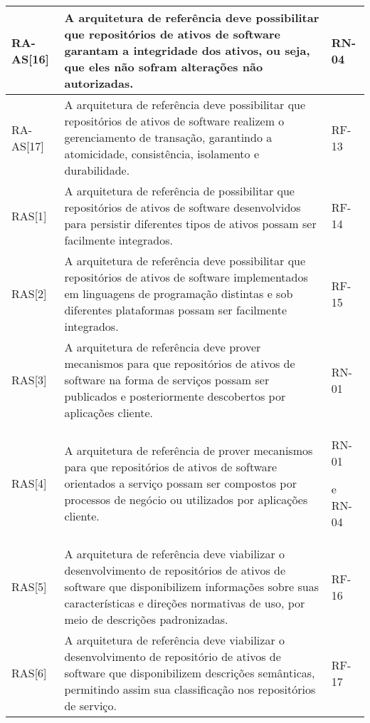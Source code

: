 \begin{longtable}{ | l | p{9cm} | p{3cm} |}
    RA-AS[16] 
    & A arquitetura de referência deve possibilitar que  repositórios de ativos de software garantam a  integridade dos ativos, ou seja, que eles não sofram  alterações não autorizadas.
    & RN-04
    \\ \hline

    RA-AS[17] 
    & A arquitetura de referência deve possibilitar que  repositórios de ativos de software realizem o  gerenciamento de transação, garantindo a atomicidade,  consistência, isolamento e durabilidade.
    & RF-13 
    \\ \hline

    RAS[1]
    & A arquitetura de referência de possibilitar que repositórios de  ativos de software desenvolvidos para persistir diferentes tipos  de ativos possam ser facilmente integrados.
    & RF-14
    \\ \hline

    RAS[2] 
    & A arquitetura de referência deve possibilitar que repositórios de ativos de software implementados em linguagens de  programação distintas e sob diferentes plataformas possam ser  facilmente integrados.
    & RF-15 
    \\ \hline

    RAS[3] 
    & A arquitetura de referência deve prover mecanismos para que  repositórios de ativos de software na forma de serviços possam  ser publicados e posteriormente descobertos por aplicações  cliente.
    & RN-01 
    \\ \hline
    
    RAS[4] & 
    A arquitetura de referência de prover mecanismos para que  repositórios de ativos de software orientados a serviço possam  ser compostos por processos de negócio ou utilizados por  aplicações cliente. 
    & RN-01
    
    e RN-04 
    \\ \hline

    RAS[5] & 
    A arquitetura de referência deve viabilizar o desenvolvimento  de repositórios de ativos de software que disponibilizem  informações sobre suas características e direções normativas de  uso, por meio de descrições padronizadas.
    & RF-16
    \\ \hline

    RAS[6] 
    & A arquitetura de referência deve viabilizar o desenvolvimento  de repositório de ativos de software que disponibilizem  descrições semânticas, permitindo assim sua classificação nos  repositórios de serviço.
    & RF-17
    \\ \hline


\end{longtable}
